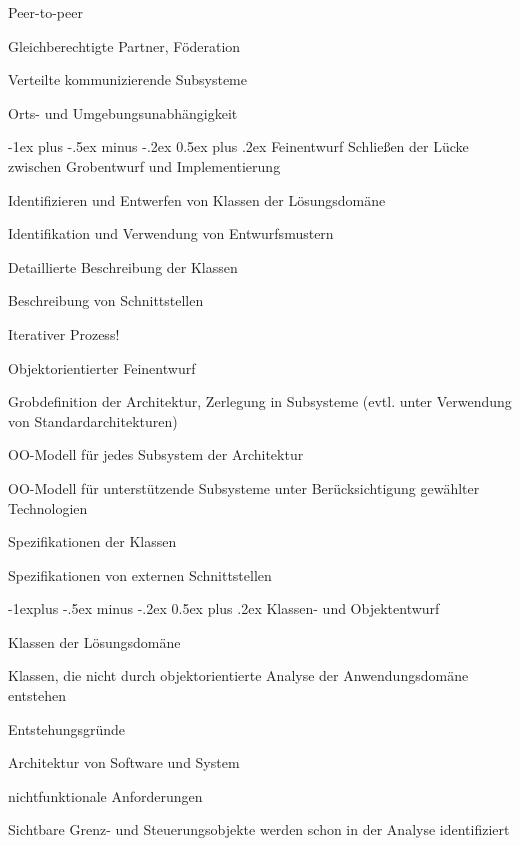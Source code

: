 \documentclass[a4paper]{article}
\makeatletter
\renewcommand{\section}{\@startsection{section}{1}{0mm}%
                                {-1ex plus -.5ex minus -.2ex}%
                                {0.5ex plus .2ex}%
                                {\normalfont\large\bfseries}}
\renewcommand{\subsection}{\@startsection{subsection}{2}{0mm}%
                                {-1explus -.5ex minus -.2ex}%
                                {0.5ex plus .2ex}%
                                {\normalfont\normalsize\bfseries}}
\makeatother
\begin{document}
\begin{multicols}{3}
  Peer-to-peer
  \begin{itemize*}
    \item Gleichberechtigte Partner, Föderation
    \item Verteilte kommunizierende Subsysteme
    \item Orts- und Umgebungsunabhängigkeit
  \end{itemize*}


  \newpage
  \section{Feinentwurf}
  Schließen der Lücke zwischen Grobentwurf und Implementierung
  \begin{itemize*}
    \item Identifizieren und Entwerfen von Klassen der Lösungsdomäne
    \item Identifikation und Verwendung von Entwurfsmustern
    \item Detaillierte Beschreibung der Klassen
    \item Beschreibung von Schnittstellen
    \item Iterativer Prozess!
  \end{itemize*}

  Objektorientierter Feinentwurf
  \begin{itemize*}
      \item Grobdefinition der Architektur, Zerlegung in Subsysteme (evtl. unter Verwendung von Standardarchitekturen)
      \item OO-Modell für jedes Subsystem der Architektur
      \item OO-Modell für unterstützende Subsysteme unter Berücksichtigung gewählter Technologien
      \item Spezifikationen der Klassen
      \item Spezifikationen von externen Schnittstellen
    \end{itemize*}

  \subsection{Klassen- und Objektentwurf}
  \begin{itemize*}
    \item Klassen der Lösungsdomäne
      \item Klassen, die nicht durch objektorientierte Analyse der Anwendungsdomäne entstehen
    \item Entstehungsgründe
    \begin{itemize*}
      \item Architektur von Software und System
      \item nichtfunktionale Anforderungen
      \item Sichtbare Grenz- und Steuerungsobjekte werden schon in der Analyse identifiziert
    \end{itemize*}
  \end{itemize*}


\end{multicols}
\end{document}
